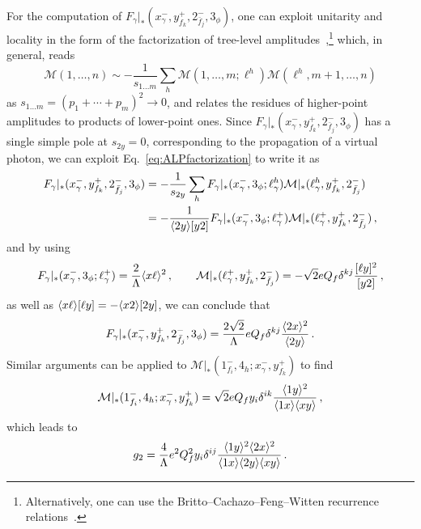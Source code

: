 For the computation of $F_\gamma|_*(x_\gamma^{-},y_{ f_k}^{+},2_{\bar f_j}^-,3_\phi)$, one
can exploit unitarity and locality in the form of the factorization of tree-level
amplitudes~\cite{Benincasa:2007xk,Arkani-Hamed:2017jhn,Mangano:1990by,Dixon:1996wi},\footnote{Alternatively,
one can use the Britto--Cachazo--Feng--Witten recurrence relations~\cite{Britto:2004ap,Britto:2005fq}.} which, in general,
reads
\begin{equation}\label{eq:ALPfactorization}
    \mathcal M(1,\dotsc,n) \sim -\frac{1}{s_{1\dots m}}\sum_h\mathcal M(1,\dotsc,m; \ell^h) \mathcal M( \ell^h,m+1,\dotsc,n)
\end{equation}
as $s_{1\dots m}=(p_1+\dotsb+ p_m)^2\to 0$, and relates the residues of higher-point amplitudes
to products of lower-point ones.
Since $F_\gamma|_*(x_\gamma^{-},y_{ f_k}^{+},2_{\bar f_j}^-,3_\phi)$ has a single simple
pole at $s_{2y}=0$, corresponding to the propagation of a virtual photon, we can exploit
Eq.~\eqref{eq:ALPfactorization} to write it as
\begin{align}
    F_\gamma|_*(x_\gamma^{-},y_{ f_k}^{+},2_{\bar f_j}^-,3_\phi) &= -\frac{1}{s_{2y}}\sum_h F_\gamma|_*(x_\gamma^{-},3_\phi;\ell^h_\gamma)\mathcal M|_*(\ell^h_\gamma,y_{ f_k}^{+},2_{\bar f_j}^-)\nonumber \\
    &= -\frac{1}{\langle 2 y \rangle\lbrack y 2 \rbrack} F_\gamma|_*(x_\gamma^{-},3_\phi;\ell^+_\gamma)\mathcal M|_*(\ell^+_\gamma,y_{ f_k}^{+},2_{\bar f_j}^-)\,,
\end{align}
and by using
\begin{equation}
    F_\gamma|_*(x_\gamma^{-},3_\phi;\ell^+_\gamma) = \frac{2}{\Lambda}\langle x \ell \rangle^2\,, \qquad
    \mathcal M|_*(\ell^+_\gamma,y_{ f_k}^{+},2_{\bar f_j}^-) =- \sqrt 2 e Q_f \delta^{kj}\frac{\lbrack \ell y \rbrack^2}{\lbrack y 2 \rbrack}\,,
\end{equation}
as well as $\langle x \ell \rangle\lbrack \ell y \rbrack=-\langle x 2 \rangle\lbrack 2 y \rbrack$, we can conclude that
\begin{equation}
    F_\gamma|_*(x_\gamma^{-},y_{ f_k}^{+},2_{\bar f_j}^-,3_\phi) = \frac{2\sqrt 2}{\Lambda}eQ_f \delta^{kj} \frac{\langle 2 x \rangle^2}{\langle 2 y \rangle}\,.
\end{equation}
Similar arguments can be applied to
$\mathcal M|_*(1_{ f_i}^-,4_h;x_\gamma^{-},y_{ f_k}^{+})$ to find
\begin{equation}
    \mathcal M|_*(1_{ f_i}^-,4_h;x_\gamma^{-},y_{ f_k}^{+}) = \sqrt 2 e Q_f y_i \delta^{ik} \frac{\langle 1 y \rangle^2}{\langle 1 x \rangle\langle x y \rangle}\,,
\end{equation}
which leads to
\begin{equation}\label{eq:ALPexprB}
    g_2= \frac{4}{\Lambda}e^2 Q_f^2 y_i\delta^{ij}\frac{\langle 1 y \rangle^2\langle 2 x \rangle^2}{\langle 1 x \rangle\langle 2 y \rangle\langle x y \rangle}\,.
\end{equation}

